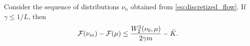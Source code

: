 \begin{theorem}\label{th:rates_mmd}
	Consider the sequence of distributions $\nu_n$ obtained from \cref{eq:discretized_flow}. If $\gamma \leq 1/L$, then
\begin{align}
{{\mathcal F}}(\nu_m)-{{\mathcal F}}(\mu)\leq  \frac{W_2^2(\nu_0,\mu)}{2 \gamma m} -\bar{K}.
\end{align}
\end{theorem}

